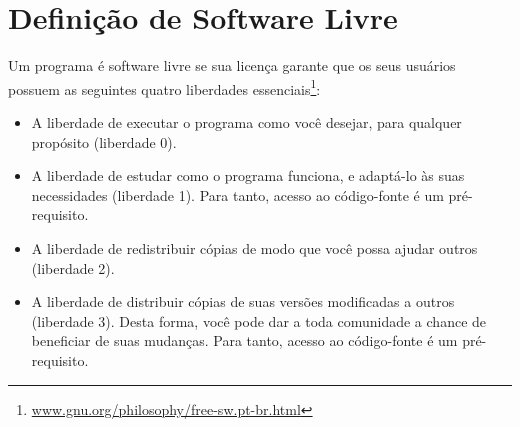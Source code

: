 \chapter{Definição de Software Livre}
\label{ann:softlivre}

Um programa é software livre se sua licença garante que os seus usuários possuem as seguintes quatro liberdades essenciais\footnote{\url{www.gnu.org/philosophy/free-sw.pt-br.html}}:
\begin{itemize}
  \item A liberdade de executar o programa como você desejar, para qualquer propósito (liberdade 0).
  \item A liberdade de estudar como o programa funciona, e adaptá-lo às suas necessidades (liberdade 1). Para tanto, acesso ao código-fonte é um pré-requisito.
  \item A liberdade de redistribuir cópias de modo que você possa ajudar outros (liberdade 2).
  \item A liberdade de distribuir cópias de suas versões modificadas a outros (liberdade 3). Desta forma, você pode dar a toda comunidade a chance de beneficiar de suas mudanças. Para tanto, acesso ao código-fonte é um pré-requisito.
\end{itemize}
